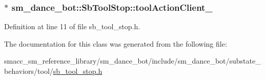 \subsubsection[{\texorpdfstring{tool\+Action\+Client\+\_\+}{toolActionClient_}}]{$\ast$ sm\+\_\+dance\+\_\+bot\+::\+Sb\+Tool\+Stop\+::tool\+Action\+Client\+\_\+}\hypertarget{classsm__dance__bot_1_1SbToolStop_a1f19d8fec8a4c7d92034b53e4334c180}{}\label{classsm__dance__bot_1_1SbToolStop_a1f19d8fec8a4c7d92034b53e4334c180}


Definition at line 11 of file sb\+\_\+tool\+\_\+stop.\+h.



The documentation for this class was generated from the following file\+:\begin{DoxyCompactItemize}
\item 
smacc\+\_\+sm\+\_\+reference\+\_\+library/sm\+\_\+dance\+\_\+bot/include/sm\+\_\+dance\+\_\+bot/substate\+\_\+behaviors/tool/\hyperlink{sb__tool__stop_8h}{sb\+\_\+tool\+\_\+stop.\+h}\end{DoxyCompactItemize}
